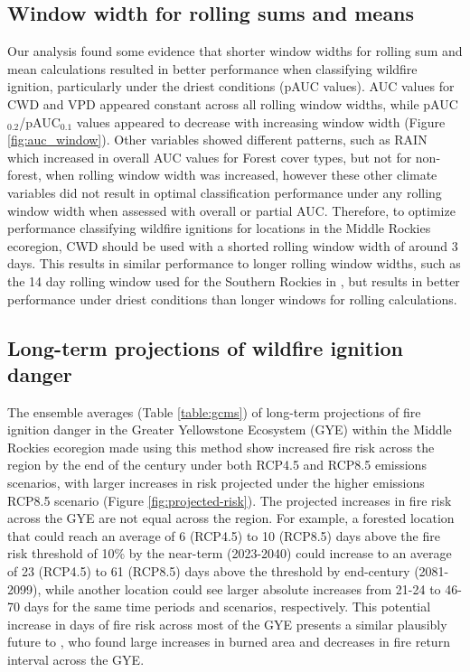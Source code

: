 \documentclass[11pt]{article}
\begin{document}
\subsection{Window width for rolling sums and means}

Our analysis found some evidence that shorter window widths for rolling sum and mean calculations resulted in better performance when classifying wildfire ignition, particularly under the driest conditions (pAUC values). AUC values for CWD and VPD appeared constant across all rolling window widths, while pAUC$_{0.2}$/pAUC$_{0.1}$ values appeared to decrease with increasing window width (Figure \ref{fig:auc_window}). Other variables showed different patterns, such as RAIN which increased in overall AUC values for Forest cover types, but not for non-forest, when rolling window width was increased, however these other climate variables did not result in optimal classification performance under any rolling window width when assessed with overall or partial AUC.  Therefore, to optimize performance classifying wildfire ignitions for locations in the Middle Rockies ecoregion, CWD should be used with a shorted rolling window width of around 3 days.  This results in similar performance to longer rolling window widths, such as the 14 day rolling window used for the Southern Rockies in  \citet{thomaWaterBalanceIndicator2020}, but results in better performance under driest conditions than longer windows for rolling calculations.

\subsection{Long-term projections of wildfire ignition danger}

The ensemble averages (Table \ref{table:gcms}) of long-term projections of fire ignition danger in the Greater Yellowstone Ecosystem (GYE) within the Middle Rockies ecoregion made using this method show increased fire risk across the region by the end of the century under both RCP4.5 and RCP8.5 emissions scenarios, with larger increases in risk projected under the higher emissions RCP8.5 scenario (Figure \ref{fig:projected-risk}). The projected increases in fire risk across the GYE are not equal across the region.  For example, a forested location that could reach an average of 6 (RCP4.5) to 10 (RCP8.5) days above the fire risk threshold of 10\% by the near-term (2023-2040) could increase to an average of 23 (RCP4.5) to 61 (RCP8.5) days above the threshold by end-century (2081-2099), while another location could see larger absolute increases from 21-24 to 46-70 days for the same time periods and scenarios, respectively.  This potential increase in days of fire risk across most of the GYE presents a similar plausibly future to \citet{westerlingContinuedWarmingCould2011}, who found large increases in burned area and decreases in fire return interval across the GYE.  
\end{document}
